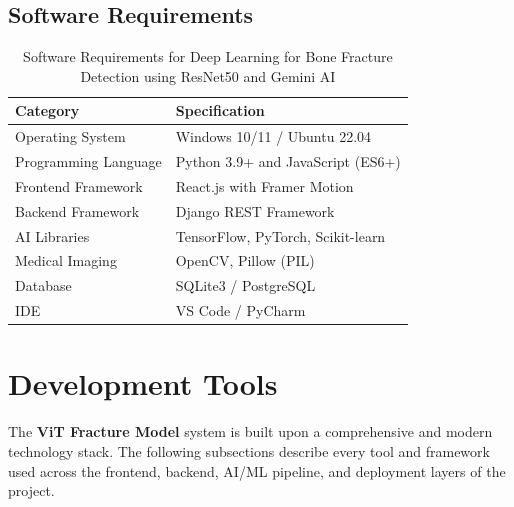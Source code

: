 \documentclass[a4paper,12pt]{report}
\begin{document}
    \subsection{Software Requirements}
    \begin{table}[H]
    \centering
    \renewcommand{\arraystretch}{1.3}
    \begin{tabular}{|p{4cm}|p{9cm}|}
    \hline
    \textbf{Category} & \textbf{Specification} \\ \hline
    Operating System & Windows 10/11 / Ubuntu 22.04 \\ \hline
    Programming Language & Python 3.9+ and JavaScript (ES6+) \\ \hline
    Frontend Framework & React.js with Framer Motion \\ \hline
    Backend Framework & Django REST Framework \\ \hline
    AI Libraries & TensorFlow, PyTorch, Scikit-learn \\ \hline
    Medical Imaging & OpenCV, Pillow (PIL) \\ \hline
    Database & SQLite3 / PostgreSQL \\ \hline
    IDE & VS Code / PyCharm \\ \hline
    \end{tabular}
    \caption{Software Requirements for Deep Learning for Bone Fracture Detection using ResNet50 and Gemini AI}
    \end{table}

    \section{Development Tools}

    The \textbf{ViT Fracture Model} system is built upon a comprehensive and modern technology stack. The following subsections describe every tool and framework used across the frontend, backend, AI/ML pipeline, and deployment layers of the project.

\end{document}
